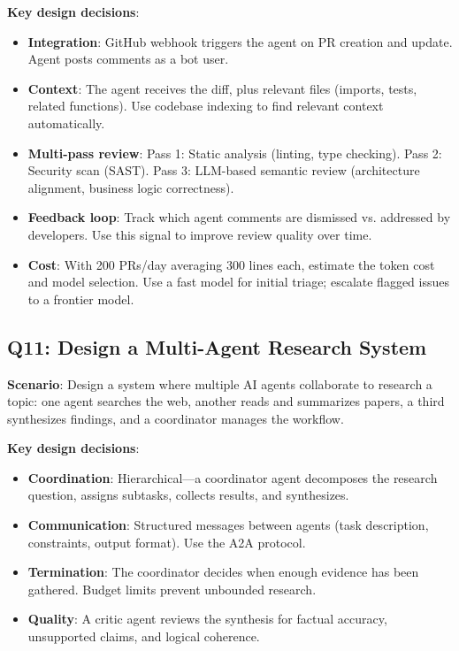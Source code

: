 \textbf{Key design decisions}:
\begin{itemize}[leftmargin=*]
    \item \textbf{Integration}: GitHub webhook triggers the agent on PR creation and update. Agent posts comments as a bot user.
    \item \textbf{Context}: The agent receives the diff, plus relevant files (imports, tests, related functions). Use codebase indexing to find relevant context automatically.
    \item \textbf{Multi-pass review}: Pass 1: Static analysis (linting, type checking). Pass 2: Security scan (SAST). Pass 3: LLM-based semantic review (architecture alignment, business logic correctness).
    \item \textbf{Feedback loop}: Track which agent comments are dismissed vs. addressed by developers. Use this signal to improve review quality over time.
    \item \textbf{Cost}: With 200 PRs/day averaging 300 lines each, estimate the token cost and model selection. Use a fast model for initial triage; escalate flagged issues to a frontier model.
\end{itemize}

\subsection{Q11: Design a Multi-Agent Research System}

\textbf{Scenario}: Design a system where multiple AI agents collaborate to research a topic: one agent searches the web, another reads and summarizes papers, a third synthesizes findings, and a coordinator manages the workflow.

\textbf{Key design decisions}:
\begin{itemize}[leftmargin=*]
    \item \textbf{Coordination}: Hierarchical---a coordinator agent decomposes the research question, assigns subtasks, collects results, and synthesizes.
    \item \textbf{Communication}: Structured messages between agents (task description, constraints, output format). Use the A2A protocol.
    \item \textbf{Termination}: The coordinator decides when enough evidence has been gathered. Budget limits prevent unbounded research.
    \item \textbf{Quality}: A critic agent reviews the synthesis for factual accuracy, unsupported claims, and logical coherence.
\end{itemize}


